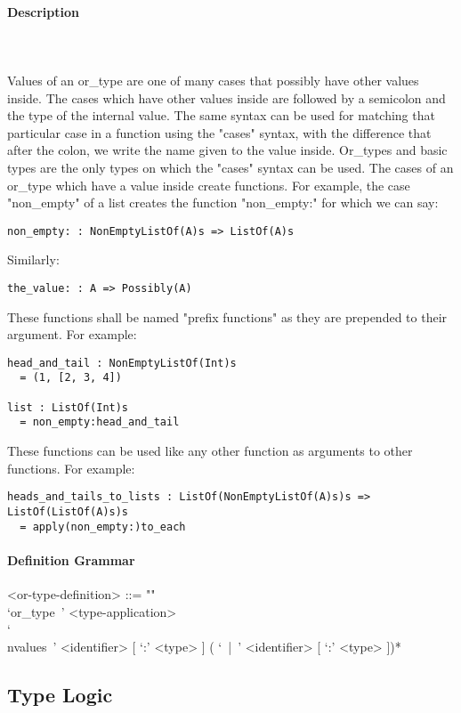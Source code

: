 \documentclass{article}
\def\pend{\mbox{} \\\\}
\begin{document}
\paragraph{Description}\pend
Values of an or\_type are one of many cases that possibly have other values
inside.  The cases which have other values inside are followed by a semicolon
and the type of the internal value. The same syntax can be used for matching
that particular case in a function using the "cases" syntax, with the
difference that after the colon, we write the name given to the value inside.
Or\_types and basic types are the only types on which the "cases" syntax can be
used. The cases of an or\_type which have a value inside create functions. For
example, the case "non\_empty" of a list creates the function "non\_empty:" for
which we can say:
\begin{verbatim}
non_empty: : NonEmptyListOf(A)s => ListOf(A)s
\end{verbatim}
Similarly:
\begin{verbatim}
the_value: : A => Possibly(A)
\end{verbatim}
These functions shall be named "prefix functions" as they are prepended to their
argument.
For example:
\begin{verbatim}
head_and_tail : NonEmptyListOf(Int)s
  = (1, [2, 3, 4])

list : ListOf(Int)s
  = non_empty:head_and_tail
\end{verbatim}
These functions can be used like any other function as arguments to other functions.
For example:
\begin{verbatim}
heads_and_tails_to_lists : ListOf(NonEmptyListOf(A)s)s => ListOf(ListOf(A)s)s
  = apply(non_empty:)to_each
\end{verbatim}

\paragraph{Definition Grammar}
\begin{grammar}
<or-type-definition> ::= ""\\
`or_type\ ' <type-application> 
\\`\\nvalues\ ' <identifier> [ `:' <type> ] ( `\ |\ ' <identifier> [ `:' <type> ])*
\end{grammar}

\subsection{Type Logic}
\label{subsec:typelogic}
\end{document}
